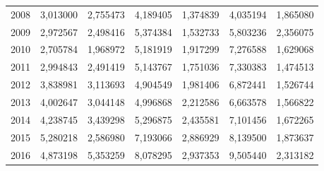 \begin{table}
\begin{tabular}{p{1cm}p{2cm}p{2cm}p{2cm}p{2cm}p{2cm}p{2cm}}
 2008 &                         3,013000 &                                           2,755473 &                                    4,189405 &                            1,374839 &                       4,035194 &   1,865080 \\
 2009 &                         2,972567 &                                           2,498416 &                                    5,374384 &                            1,532733 &                       5,803236 &   2,356075 \\
 2010 &                         2,705784 &                                           1,968972 &                                    5,181919 &                            1,917299 &                       7,276588 &   1,629068 \\
 2011 &                         2,994843 &                                           2,491419 &                                    5,143767 &                            1,751036 &                       7,330383 &   1,474513 \\
 2012 &                         3,838981 &                                           3,113693 &                                    4,904549 &                            1,981406 &                       6,872441 &   1,526744 \\
 2013 &                         4,002647 &                                           3,044148 &                                    4,996868 &                            2,212586 &                       6,663578 &   1,566822 \\
 2014 &                         4,238745 &                                           3,439298 &                                    5,296875 &                            2,435581 &                       7,101456 &   1,672265 \\
 2015 &                         5,280218 &                                           2,586980 &                                    7,193066 &                            2,886929 &                       8,139500 &   1,873637 \\
 2016 &                         4,873198 &                                           5,353259 &                                    8,078295 &                            2,937353 &                       9,505440 &   2,313182 \\
\bottomrule
\end{tabular}
\end{table}
